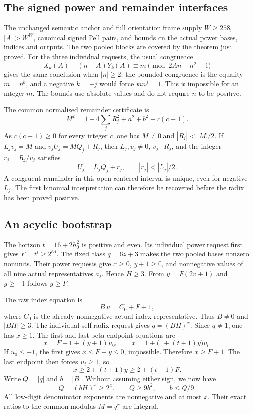\subsection{The signed power and remainder interfaces}

The unchanged semantic anchor and full orientation frame supply
$W\ge258$, $|A|>W^W$, canonical signed Pell pairs, and bounds on the
actual power bases, indices and outputs. The two pooled blocks are
covered by the theorem just proved. For the three individual requests,
the usual congruence
\[
 X_k(A)+(n-A)Y_k(A)\equiv m\pmod{2An-n^2-1}
\]
gives the same conclusion when $|n|\ge2$: the bounded congruence
is the equality $m=n^k$, and a negative $k=-j$ would force
$mn^j=1$. This is impossible for an integer $m$. The bounds use
absolute values and do not require $n$ to be positive.

The common normalized remainder certificate is
\[
 M^2=1+4\sum_j R_j^2+a^2+b^2+c(c+1).
\]
As $c(c+1)\ge0$ for every integer $c$, one has $M\ne0$ and
$|R_j|<|M|/2$. If $L_jv_j=M$ and $v_jU_j=MQ_j+R_j$, then
$L_j,v_j\ne0$, $v_j\mid R_j$, and the integer $r_j=R_j/v_j$ satisfies
\[
 U_j=L_jQ_j+r_j,\qquad |r_j|<|L_j|/2.
\]
A congruent remainder in this open centered interval is unique, even
for negative $L_j$. The first binomial interpretation can therefore be
recovered before the radix has been proved positive.

\subsection{An acyclic bootstrap}

The horizon $t=16+2h_0^2$ is positive and even. Its individual power
request first gives $F=t^t\ge2^{64}$.
The fixed class $q=6z+3$ makes the two pooled bases nonzero nonunits.
Their power requests give $x\ge0$, $y+1\ge0$, and nonnegative values
of all nine actual representatives $a_j$. Hence $H\ge3$.
From $y=F(2v+1)$ and $y\ge-1$ follows $y\ge F$.

The raw index equation is
\[
 B\,u=C_0+F+1,
\]
where $C_0$ is the already nonnegative actual index representative.
Thus $B\ne0$ and $|BH|\ge3$. The individual self-radix request
gives $q=(BH)^x$. Since $q\ne1$, one has $x\ge1$.
The first and last beta endpoint equations are
\[
 x=F+1+(y+1)u_0,
 \qquad x=1+\bigl(1+(t+1)y\bigr)u_t.
\]
If $u_0\le-1$, the first gives $x\le F-y\le0$, impossible.
Therefore $x\ge F+1$. The last endpoint then forces $u_t\ge1$, so
\begin{equation}\label{eq:xlarge}
 x\ge2+(t+1)y\ge2+(t+1)F.
\end{equation}
Write $Q=|q|$ and $b=|B|$. Without assuming either sign, we now have
\[
 Q=(bH)^x\ge2^x,\qquad Q\ge9b^2,\qquad b\le Q/9.
\]
All low-digit denominator exponents are nonnegative and at most $x$.
Their exact ratios to the common modulus $M=q^x$ are integral.

